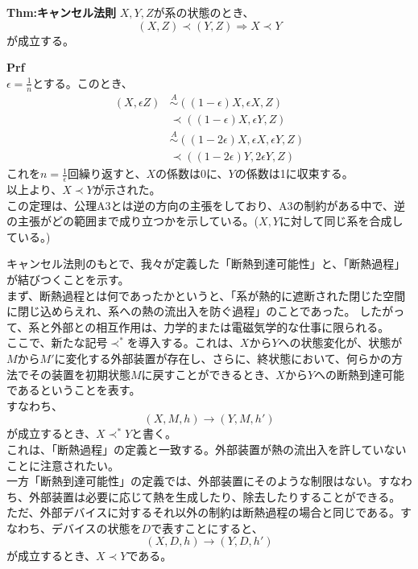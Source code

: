 \documentclass[a4paper,11pt]{jsarticle}
\numberwithin{equation}{section}
\begin{document}
\begin{itembox}[l]{\textbf{Thm:キャンセル法則}}
    $X,Y,Z$が系の状態のとき、
    \begin{equation}
        (X,Z) \prec (Y,Z) \Rightarrow X \prec Y
    \end{equation}
    が成立する。

\end{itembox}
\textbf{Prf}\\
$\epsilon =\frac{1}{n}$とする。このとき、
\begin{align}
    (X,\epsilon Z) &\overset{A}{\sim} ((1-\epsilon)X,\epsilon X,Z)\\
    &\prec ((1-\epsilon)X,\epsilon Y,Z)\\
    &\overset{A}{\sim} ((1-2\epsilon)X,\epsilon X,\epsilon Y,Z)\\
    &\prec ((1-2\epsilon)Y,2\epsilon Y,Z)
    \end{align}
これを$n=\frac{1}{\epsilon}$回繰り返すと、$X$の係数は0に、$Y$の係数は1に収束する。\\
以上より、$X \prec Y$が示された。\hfill\qedsymbol\\
この定理は、公理A3とは逆の方向の主張をしており、A3の制約がある中で、逆の主張がどの範囲まで成り立つかを示している。($X,Y$に対して同じ系を合成している。)

キャンセル法則のもとで、我々が定義した「断熱到達可能性」と、「断熱過程」が結びつくことを示す。\\
まず、断熱過程とは何であったかというと、「系が熱的に遮断された閉じた空間に閉じ込めらえれ、系への熱の流出入を防ぐ過程」のことであった。
したがって、系と外部との相互作用は、力学的または電磁気学的な仕事に限られる。\\
ここで、新たな記号$\prec ^*$を導入する。これは、$X$から$Y$への状態変化が、状態が$M$から$M'$に変化する外部装置が存在し、さらに、終状態において、何らかの方法でその装置を初期状態$M$に戻すことができるとき、$X$から$Y$への断熱到達可能であるということを表す。\\
すなわち、
\begin{equation}
    (X,M,h) \rightarrow (Y,M,h')
\end{equation}
が成立するとき、$X \prec ^* Y$と書く。\\
これは、「断熱過程」の定義と一致する。外部装置が熱の流出入を許していないことに注意されたい。\\

一方「断熱到達可能性」の定義では、外部装置にそのような制限はない。すなわち、外部装置は必要に応じて熱を生成したり、除去したりすることができる。\\
ただ、外部デバイスに対するそれ以外の制約は断熱過程の場合と同じである。すなわち、デバイスの状態を$D$で表すことにすると、
\begin{equation}
    (X,D,h) \rightarrow (Y,D,h')
\end{equation}
が成立するとき、$X \prec Y$である。\\
\end{document}
